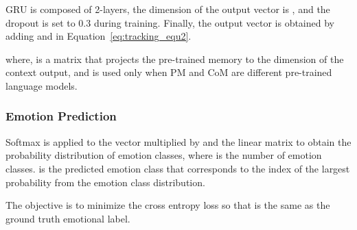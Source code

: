 \documentclass[11pt]{article}
\begin{document}
GRU is composed of 2-layers, the dimension of the output vector is , and the dropout is set to 0.3 during training. Finally, the output vector  is obtained by adding  and  in Equation~\ref{eq:tracking_equ2}.




where,  is a matrix that projects the pre-trained memory to the dimension of the context output, and is used only when PM and CoM are different pre-trained language models.







\subsubsection{Emotion Prediction}
Softmax is applied to the vector multiplied by  and the linear matrix  to obtain the probability distribution of emotion classes, where  is the number of emotion classes.  is the predicted emotion class that corresponds to the index of the largest probability from the emotion class distribution.

The objective is to minimize the cross entropy loss so that  is the same as the ground truth emotional label.


\begin{table*}[!t]
\centering
{}
\caption{Statistics and descriptions for the four datasets. DailyDialog uses 7 classes for training, but we measure Macro-F1 for only 6 classes excluding neutral. MELD and EmoryNLP are used to measure weighted avg F1 for both emotion (7) and sentiment (3) classes.}
\label{Tab:dataset}
\end{table*}
\end{document}
